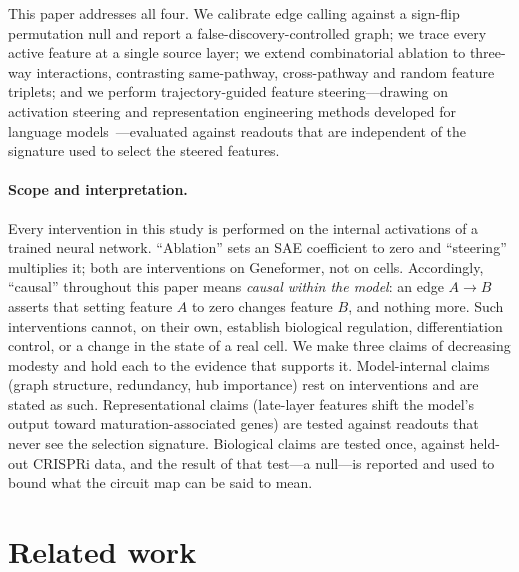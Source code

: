 \documentclass[11pt,onecolumn]{article}
\begin{document}
This paper addresses all four. We calibrate edge calling against a sign-flip permutation null and report a false-discovery-controlled graph; we trace every active feature at a single source layer; we extend combinatorial ablation to three-way interactions, contrasting same-pathway, cross-pathway and random feature triplets; and we perform trajectory-guided feature steering---drawing on activation steering and representation engineering methods developed for language models~\citep{turner2023activation,li2024inference,zou2023representation}---evaluated against readouts that are independent of the signature used to select the steered features.

\paragraph{Scope and interpretation.}
Every intervention in this study is performed on the internal activations of a trained neural network. ``Ablation'' sets an SAE coefficient to zero and ``steering'' multiplies it; both are interventions on Geneformer, not on cells. Accordingly, ``causal'' throughout this paper means \emph{causal within the model}: an edge $A\to B$ asserts that setting feature $A$ to zero changes feature $B$, and nothing more. Such interventions cannot, on their own, establish biological regulation, differentiation control, or a change in the state of a real cell. We make three claims of decreasing modesty and hold each to the evidence that supports it. Model-internal claims (graph structure, redundancy, hub importance) rest on interventions and are stated as such. Representational claims (late-layer features shift the model's output toward maturation-associated genes) are tested against readouts that never see the selection signature. Biological claims are tested once, against held-out CRISPRi data, and the result of that test---a null---is reported and used to bound what the circuit map can be said to mean.


\section{Related work}
\label{sec:related}
\end{document}
